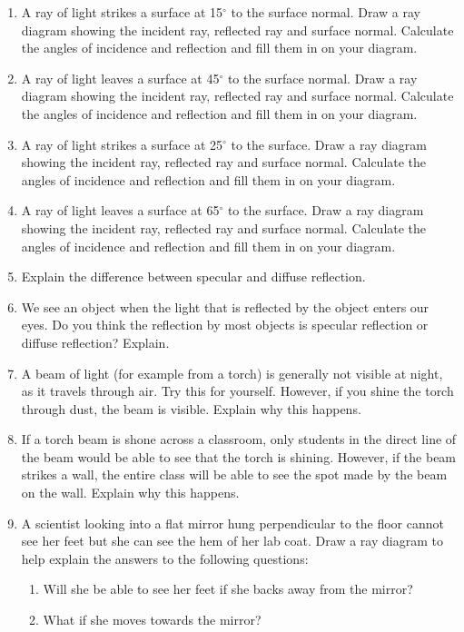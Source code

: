 {\begin{enumerate}
{}
\item A ray of light strikes a surface at 15$^{\circ}$ to the surface normal. Draw a ray diagram showing the incident ray, reflected ray and surface normal. Calculate the angles of incidence and reflection and fill them in on your diagram.
\item A ray of light leaves a surface at 45$^{\circ}$ to the surface normal. Draw a ray diagram showing the incident ray, reflected ray and surface normal. Calculate the angles of incidence and reflection and fill them in on your diagram.
\item A ray of light strikes a surface at 25$^{\circ}$ to the surface. Draw a ray diagram showing the incident ray, reflected ray and surface normal. Calculate the angles of incidence and reflection and fill them in on your diagram.
\item A ray of light leaves a surface at 65$^{\circ}$ to the surface. Draw a ray diagram showing the incident ray, reflected ray and surface normal. Calculate the angles of incidence and reflection and fill them in on your diagram.
\item Explain the difference between specular and diffuse reflection.
\item{We see an object when the light that is reflected by the object enters our eyes. Do you think the reflection by most objects is specular reflection or diffuse reflection? Explain.}
\item{A beam of light (for example from a torch) is generally not visible at night, as it travels through air. Try this for yourself. However, if you shine the torch through dust, the beam is visible. Explain why this happens.}
\item{If a torch beam is shone across a classroom, only students in the direct line of the beam would be able to see that the torch is shining. However, if the beam strikes a wall, the entire class will be able to see the spot made by the beam on the wall. Explain why this happens.}
\item{A scientist looking into a flat mirror hung perpendicular to the floor cannot see her feet but she can see the hem of her lab coat. Draw a ray diagram to help explain the answers to the following questions:
\begin{enumerate}
\item Will she be able to see her feet if she backs away from the mirror?
\item What if she moves towards the mirror?
\end{enumerate}}
\end{enumerate}
}
